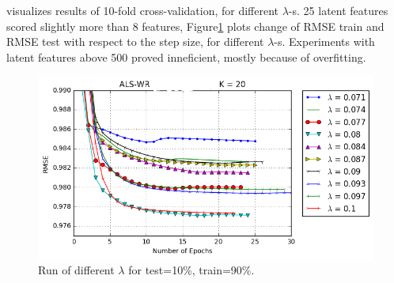 visualizes results of 10-fold cross-validation, for different $\lambda$-s. 25 latent features scored slightly more than 8 features, Figure\ref{fig:cv_lambdas} plots change of RMSE train and RMSE test with respect to the step size, for different $\lambda$-s. Experiments with latent features above 500 proved inneficient, mostly because of overfitting.

\begin{figure}[!tbp]
  \includegraphics[width=.9\columnwidth]{figures/scaled_test_train.png}
  \caption{Run of different $\lambda$ for test=10\%, train=90\%.}
  \label{fig:cv_lambdas}
\end{figure}
